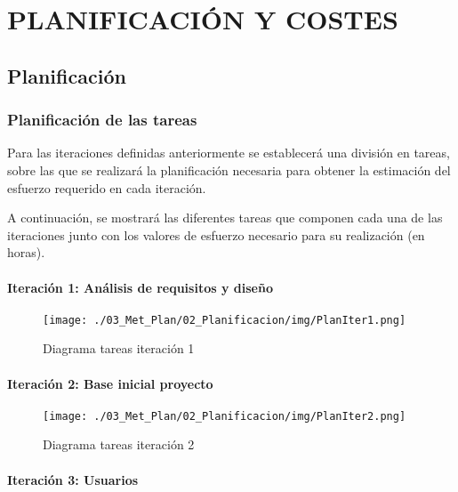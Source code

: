 \chapter[Planificación y costes]{
  \label{chp:planificacion}
  PLANIFICACIÓN Y COSTES
}
\thispagestyle{numberingStyle}
\pagestyle{numberingStyle}



\section{Planificación}

\subsection{Planificación de las tareas}
Para las iteraciones definidas anteriormente se establecerá una división en tareas, sobre las que se realizará la planificación necesaria para obtener la estimación del esfuerzo requerido en cada iteración.

A continuación, se mostrará las diferentes tareas que componen cada una de las iteraciones junto con los valores de esfuerzo necesario para su realización (en horas).

\subsubsection*{Iteración 1: Análisis de requisitos y diseño}

\begin{figure}[H]
\vspace{-0.5cm}
\texttt{[image: ./03\_Met\_Plan/02\_Planificacion/img/PlanIter1.png]}
\caption{Diagrama tareas iteración 1}
\end{figure}


\subsubsection*{Iteración 2: Base inicial proyecto}

\begin{figure}[H]
\vspace{-1cm}
\texttt{[image: ./03\_Met\_Plan/02\_Planificacion/img/PlanIter2.png]}
\caption{Diagrama tareas iteración 2}
\end{figure}


\subsubsection*{Iteración 3: Usuarios}

